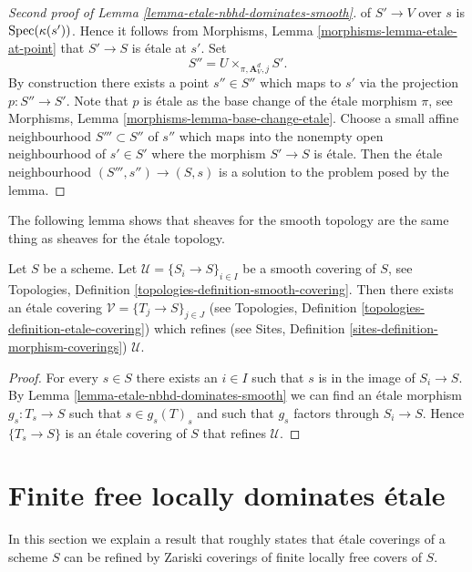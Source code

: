 \begin{proof}[Second proof of Lemma \ref{lemma-etale-nbhd-dominates-smooth}]
of $S' \to V$ over $s$ is $\mathop{\rm Spec}(\kappa(s'))$. Hence it follows from
Morphisms, Lemma \ref{morphisms-lemma-etale-at-point}
that $S' \to S$ is \'etale at $s'$. Set
$$
S'' = U \times_{\pi, \mathbf{A}^d_V, j} S'.
$$
By construction there exists a point $s'' \in S''$ which maps to
$s'$ via the projection $p : S'' \to S'$. Note that $p$ is \'etale
as the base change of the \'etale morphism $\pi$, see
Morphisms, Lemma \ref{morphisms-lemma-base-change-etale}.
Choose a small affine neighbourhood $S''' \subset S''$ of $s''$
which maps into the nonempty open neighbourhood of $s' \in S'$
where the morphism $S' \to S$ is \'etale. Then the \'etale neighbourhood
$(S''', s'') \to (S, s)$ is a solution to the problem posed by the lemma.
\end{proof}

\noindent
The following lemma shows that sheaves for the smooth topology are
the same thing as sheaves for the \'etale topology.

\begin{lemma}
\label{lemma-etale-dominates-smooth}
Let $S$ be a scheme. Let $\mathcal{U} = \{S_i \to S\}_{i \in I}$ be a smooth
covering of $S$, see
Topologies, Definition \ref{topologies-definition-smooth-covering}.
Then there exists an \'etale covering $\mathcal{V} = \{T_j \to S\}_{j \in J}$
(see
Topologies, Definition \ref{topologies-definition-etale-covering})
which refines (see
Sites, Definition \ref{sites-definition-morphism-coverings})
$\mathcal{U}$.
\end{lemma}

\begin{proof}
For every $s \in S$ there exists an $i \in I$ such that $s$ is in
the image of $S_i \to S$. By
Lemma \ref{lemma-etale-nbhd-dominates-smooth}
we can find an \'etale morphism $g_s : T_s \to S$ such that $s \in g_s(T)_s$
and such that $g_s$ factors through $S_i \to S$. Hence
$\{T_s \to S\}$ is an \'etale covering of $S$ that refines $\mathcal{U}$.
\end{proof}




\section{Finite free locally dominates \'etale}
\label{section-finite-free-over-etale}

\noindent
In this section we explain a result that roughly states that
\'etale coverings of a scheme $S$ can be refined by Zariski coverings
of finite locally free covers of $S$.


